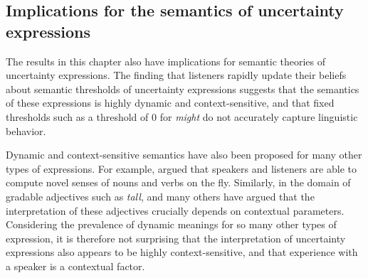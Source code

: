 \subsection{Implications for the semantics of uncertainty expressions}

The results in this chapter also have implications for semantic theories of uncertainty expressions.
The finding that listeners rapidly update their beliefs about semantic thresholds of uncertainty expressions
suggests that the semantics of these expressions is highly dynamic and context-sensitive, and that fixed thresholds
such as a threshold of 0 for \textit{might} do not accurately capture linguistic behavior.

Dynamic and context-sensitive semantics have also been proposed for many other types of expressions.
For example, \cite{Clark1983} argued that speakers and listeners
are able to compute novel senses of nouns and verbs on the fly. Similarly, in the domain of gradable adjectives such as \textit{tall},
\cite{Kennedy2007} and many others have argued that the interpretation of these adjectives crucially depends on contextual
parameters. Considering the prevalence of dynamic meanings for so many other types of expression, it is therefore not 
surprising that the interpretation of uncertainty expressions also appears to be highly context-sensitive, and that
experience with a speaker is a contextual factor.
 



